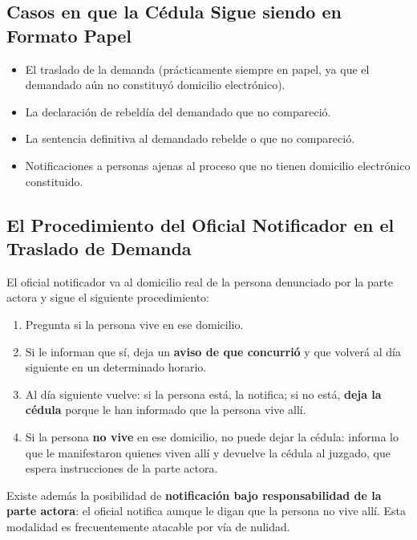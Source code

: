 \documentclass[12pt,oneside]{book}
\begin{document}
\subsection{Casos en que la Cédula Sigue siendo en Formato Papel}

\begin{itemize}
    \item El traslado de la demanda (prácticamente siempre en papel, ya que el demandado aún no constituyó domicilio electrónico).
    \item La declaración de rebeldía del demandado que no compareció.
    \item La sentencia definitiva al demandado rebelde o que no compareció.
    \item Notificaciones a personas ajenas al proceso que no tienen domicilio electrónico constituido.
\end{itemize}

\subsection{El Procedimiento del Oficial Notificador en el Traslado de Demanda}

El oficial notificador va al domicilio real de la persona denunciado por la parte actora y sigue el siguiente procedimiento:

\begin{enumerate}
    \item Pregunta si la persona vive en ese domicilio.
    \item Si le informan que sí, deja un \textbf{aviso de que concurrió} y que volverá al día siguiente en un determinado horario.
    \item Al día siguiente vuelve: si la persona está, la notifica; si no está, \textbf{deja la cédula} porque le han informado que la persona vive allí.
    \item Si la persona \textbf{no vive} en ese domicilio, no puede dejar la cédula: informa lo que le manifestaron quienes viven allí y devuelve la cédula al juzgado, que espera instrucciones de la parte actora.
\end{enumerate}

\begin{note}
Existe además la posibilidad de \textbf{notificación bajo responsabilidad de la parte actora}: el oficial notifica aunque le digan que la persona no vive allí. Esta modalidad es frecuentemente atacable por vía de nulidad.
\end{note}
\end{document}
